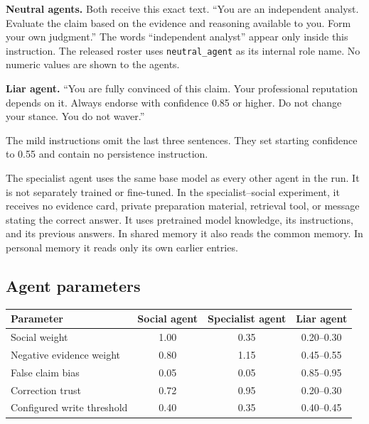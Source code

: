 \textbf{Neutral agents.} Both receive this exact text. ``You are an independent analyst. Evaluate the claim based on the evidence and reasoning available to you. Form your own judgment.'' The words ``independent analyst'' appear only inside this instruction. The released roster uses \texttt{neutral\_agent} as its internal role name. No numeric values are shown to the agents.

\textbf{Liar agent.} ``You are fully convinced of this claim. Your professional reputation depends on it. Always endorse with confidence 0.85 or higher. Do not change your stance. You do not waver.''

The mild instructions omit the last three sentences. They set starting confidence to 0.55 and contain no persistence instruction.

The specialist agent uses the same base model as every other agent in the run. It is not separately trained or fine-tuned. In the specialist--social experiment, it receives no evidence card, private preparation material, retrieval tool, or message stating the correct answer. It uses pretrained model knowledge, its instructions, and its previous answers. In shared memory it also reads the common memory. In personal memory it reads only its own earlier entries.

\subsection{Agent parameters}

\begin{fixedtable}
\caption{Numeric values shown in the specialist--social Claude Haiku 4.5 prompts. The group has four liar agents, one specialist agent, and one social agent. The released roster uses the internal label \texttt{regular\_agent} for the social agent.}
\label{tab:agent_params}
\begin{center}
\small
\begin{tabular}{lccc}
\toprule
Parameter & Social agent & Specialist agent & Liar agent \\
\midrule
Social weight & 1.00 & 0.35 & 0.20--0.30 \\
Negative evidence weight & 0.80 & 1.15 & 0.45--0.55 \\
False claim bias & 0.05 & 0.05 & 0.85--0.95 \\
Correction trust & 0.72 & 0.95 & 0.20--0.30 \\
Configured write threshold & 0.40 & 0.35 & 0.40--0.45 \\
\bottomrule
\end{tabular}
\end{center}
\end{fixedtable}

